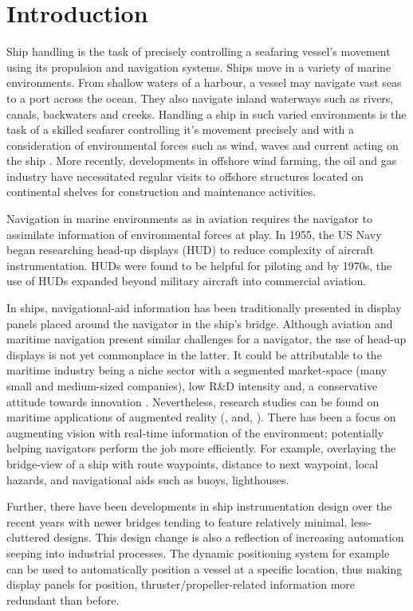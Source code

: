\chapter{Introduction}

Ship handling is the task of precisely controlling a seafaring vessel’s movement using its propulsion and navigation systems. Ships move in a variety of marine environments. From shallow waters of a harbour, a vessel may  navigate vast seas to a port across the ocean. They also navigate inland waterways such as rivers, canals, backwaters and creeks. Handling a ship in such varied environments is the task of a skilled seafarer controlling it's movement precisely and with a consideration of environmental forces such as wind, waves and current acting on the ship \parencite{wiki:seamanship}. More recently, developments in offshore wind farming, the oil and gas industry have necessitated regular visits to offshore structures located on continental shelves for construction and maintenance activities. 

Navigation in marine environments as in aviation requires the navigator to assimilate information of environmental forces at play. In 1955, the US Navy began researching head-up displays (HUD) to reduce complexity of aircraft instrumentation. HUDs were found to be helpful for piloting and by 1970s, the use of HUDs expanded beyond military aircraft into commercial aviation.

In ships, navigational-aid information has been traditionally presented in display panels placed around the navigator in the ship's bridge. Although aviation and maritime navigation present similar challenges for a navigator, the use of head-up displays is not yet commonplace in the latter. It could be attributable to the maritime industry being a niche sector with a segmented market-space (many small and medium-sized companies), low R\&D intensity and, a conservative attitude towards innovation \parencite{von2014maritime}. Nevertheless, research studies can be found on maritime applications of augmented reality (\cite{hugues2010experimental}, \cite{vasiljevic2011augmented} and, \cite{von2014maritime}). There has been a focus on augmenting vision with real-time information of the environment; potentially helping navigators perform the job more efficiently. For example, overlaying the bridge-view of a ship with route waypoints, distance to next waypoint, local hazards, and navigational aids such as buoys, lighthouses. 

Further, there have been developments in ship instrumentation design over the recent years with newer bridges tending to feature relatively minimal, less-cluttered designs. This design change is also a reflection of increasing automation seeping into industrial processes. The dynamic positioning system for example can be used to automatically position a vessel at a specific location, thus making display panels for position, thruster/propeller-related information more redundant than before. 

